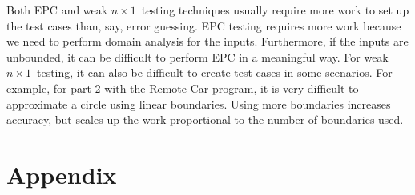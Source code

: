 \documentclass[12pt, letterpaper, titlepage]{article}
\newcommand{\nx}{$n\times1$}
\begin{document}
Both EPC and weak \nx\ testing techniques usually require more work to set up the test cases than, say, error guessing. EPC testing requires more work because we need to perform domain analysis for the inputs. Furthermore, if the inputs are unbounded, it can be difficult to perform EPC in a meaningful way. For weak \nx\ testing, it can also be difficult to create test cases in some scenarios. For example, for part 2 with the Remote Car program, it is very difficult to approximate a circle using linear boundaries. Using more boundaries increases accuracy, but scales up the work proportional to the number of boundaries used.

\newpage

\section{Appendix}
\end{document}
